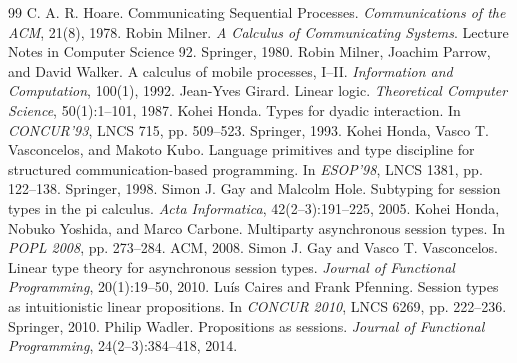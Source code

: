 \documentclass[11pt,openany]{book}
\begin{document}
\begin{thebibliography}{99}
 C. A. R. Hoare. Communicating Sequential Processes. \emph{Communications of the ACM}, 21(8), 1978.
 Robin Milner. \emph{A Calculus of Communicating Systems}. Lecture Notes in Computer Science 92. Springer, 1980.
 Robin Milner, Joachim Parrow, and David Walker. A calculus of mobile processes, I--II. \emph{Information and Computation}, 100(1), 1992.
 Jean-Yves Girard. Linear logic. \emph{Theoretical Computer Science}, 50(1):1--101, 1987.
 Kohei Honda. Types for dyadic interaction. In \emph{CONCUR'93}, LNCS 715, pp. 509--523. Springer, 1993.
 Kohei Honda, Vasco T. Vasconcelos, and Makoto Kubo. Language primitives and type discipline for structured communication-based programming. In \emph{ESOP'98}, LNCS 1381, pp. 122--138. Springer, 1998.
 Simon J. Gay and Malcolm Hole. Subtyping for session types in the pi calculus. \emph{Acta Informatica}, 42(2--3):191--225, 2005.
 Kohei Honda, Nobuko Yoshida, and Marco Carbone. Multiparty asynchronous session types. In \emph{POPL 2008}, pp. 273--284. ACM, 2008.
 Simon J. Gay and Vasco T. Vasconcelos. Linear type theory for asynchronous session types. \emph{Journal of Functional Programming}, 20(1):19--50, 2010.
 Luís Caires and Frank Pfenning. Session types as intuitionistic linear propositions. In \emph{CONCUR 2010}, LNCS 6269, pp. 222--236. Springer, 2010.
 Philip Wadler. Propositions as sessions. \emph{Journal of Functional Programming}, 24(2--3):384--418, 2014.
\end{thebibliography}

\printindex
\end{document}
